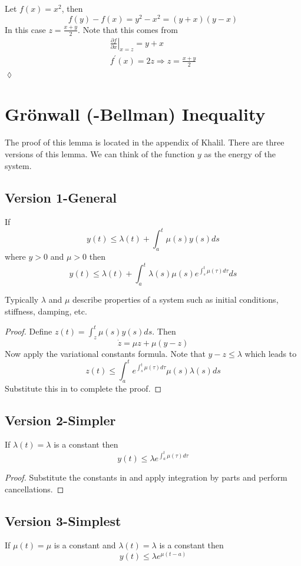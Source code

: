\begin{example}
Let $f (x) = x^2$, then
$$f (y)-f (x) = y^2-x^2 = (y+x) (y-x)$$
In this case $z=\frac{x+y}{2}$.
Note that this comes from
\begin{align*}
\left.\frac{\partial f}{\partial x}\right|_{x=z} = y+x \\
f^\prime(x) = 2z \Rightarrow z = \frac{x+y}{2}
\end{align*}
$\lozenge$
\end{example}

\section{Gr\"onwall (-Bellman) Inequality}
\label{sec:04gronwall}
The proof of this lemma is located in the appendix of Khalil.
There are three versions of this lemma.
We can think of the function $y$ as the energy of the system.

\subsection{Version 1-General}
\begin{lemma}
If
$$y(t) \leq \lambda(t) + \int_a^t\mu(s)y(s)ds$$
where $y>0$ and $\mu>0$ then
$$y(t) \leq \lambda(t) + \int_a^t \lambda(s)\mu(s) e^{\int_s^t\mu(\tau)d\tau}ds$$
\end{lemma}
Typically $\lambda$ and $\mu$ describe properties of a system such as initial conditions, stiffness, damping, etc.

\begin{proof}
Define $z(t) = \int_z^t \mu(s)y(s)ds$.
Then
$$\dot{z} = \mu z + \mu(y-z)$$
Now apply the variational constants formula.
Note that $y-z\leq\lambda$ which leads to
$$z(t) \leq \int_a^t e^{\int_s^t \mu(\tau)d\tau}\mu(s)\lambda(s)ds$$
Substitute this in to complete the proof.
\end{proof}

\subsection{Version 2-Simpler}
\begin{lemma}
If $\lambda(t) = \lambda$ is a constant then
$$y(t) \leq \lambda e^{\int_a^t \mu(\tau)d\tau}$$
\end{lemma}

\begin{proof}
Substitute the constants in and apply integration by parts and perform cancellations.
\end{proof}

\subsection{Version 3-Simplest}
\begin{lemma}
If $\mu(t) = \mu$ is a constant and $\lambda(t) = \lambda$ is a constant then
$$y(t) \leq \lambda e^{\mu(t-a)}$$
\end{lemma}
